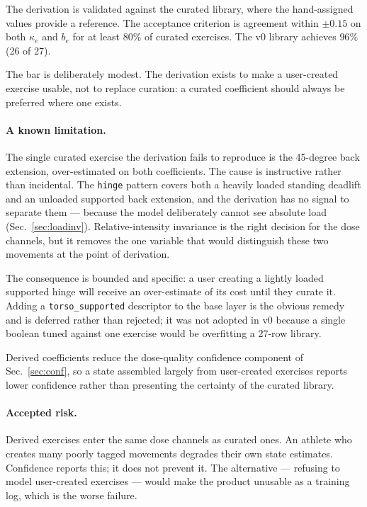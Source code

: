 \documentclass[11pt]{article}
\begin{document}
The derivation is validated against the curated library, where the hand-assigned values provide a reference. The acceptance criterion is agreement within $\pm0.15$ on both $\kappa_e$ and $b_e$ for at least $80\%$ of curated exercises. The v0 library achieves $96\%$ (26 of 27).

The bar is deliberately modest. The derivation exists to make a user-created exercise usable, not to replace curation: a curated coefficient should always be preferred where one exists.

\paragraph{A known limitation.} The single curated exercise the derivation fails to reproduce is the 45-degree back extension, over-estimated on both coefficients. The cause is instructive rather than incidental. The \texttt{hinge} pattern covers both a heavily loaded standing deadlift and an unloaded supported back extension, and the derivation has no signal to separate them --- because the model deliberately cannot see absolute load (Sec.~\ref{sec:loadinv}). Relative-intensity invariance is the right decision for the dose channels, but it removes the one variable that would distinguish these two movements at the point of derivation.

The consequence is bounded and specific: a user creating a lightly loaded supported hinge will receive an over-estimate of its cost until they curate it. Adding a \texttt{torso\_supported} descriptor to the base layer is the obvious remedy and is deferred rather than rejected; it was not adopted in v0 because a single boolean tuned against one exercise would be overfitting a 27-row library.

Derived coefficients reduce the dose-quality confidence component of Sec.~\ref{sec:conf}, so a state assembled largely from user-created exercises reports lower confidence rather than presenting the certainty of the curated library.

\paragraph{Accepted risk.} Derived exercises enter the same dose channels as curated ones. An athlete who creates many poorly tagged movements degrades their own state estimates. Confidence reports this; it does not prevent it. The alternative --- refusing to model user-created exercises --- would make the product unusable as a training log, which is the worse failure.
\end{document}
